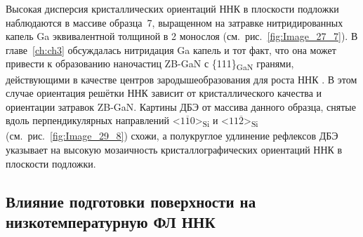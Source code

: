 Высокая дисперсия кристаллических ориентаций ННК в плоскости подложки
наблюдаются в массиве образца~7, выращенном на затравке нитридированных капель
Ga эквивалентной толщиной в 2 монослоя (см.~рис.~\cref{fig:Image_27_7}). В
главе~\cref{ch:ch3} обсуждалась нитридация Ga капель и тот факт, что она может
привести к образованию наночастиц ZB-GaN с \{111\}\textsubscript{GaN} гранями,
действующими в качестве центров зародышеобразования для роста ННК
\cite{Fedorov2018}. В этом случае ориентация решётки ННК зависит от
кристаллического качества и ориентации затравок ZB-GaN. Картины ДБЭ от массива
данного образца, снятые вдоль перпендикулярных направлений
<\(1\overline{1}0\)>\textsubscript{Si} и <\(11\overline{2}\)>\textsubscript{Si}
(см.~рис.~\cref{fig:Image_29_8}) схожи, а полукруглое удлинение рефлексов ДБЭ
указывает на высокую мозаичность кристаллографических ориентаций ННК в
плоскости подложки.

\subsection{Влияние подготовки поверхности на низкотемпературную ФЛ ННК}\label{sec:ch3/sec2/sub6}

